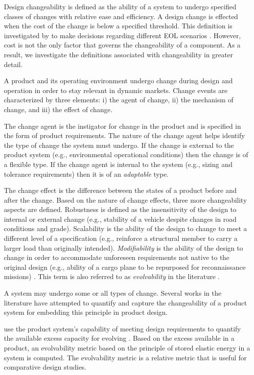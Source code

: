 Design changeability is defined as the ability of a system to undergo specified classes of changes with relative ease and efficiency. A design change is effected when the cost of the change is below a specified threshold. This definition is investigated by \citeauthor{Lawand2019} to make decisions regarding different \ac{EOL} scenarios \cite{Lawand2019}. However, cost is not the only factor that governs the changeability of a component. As a result, we investigate the definitions associated with changeability in greater detail.

A product and its operating environment undergo change during design and operation in order to stay relevant in dynamic markets. Change events are characterized by three elements: i) the agent of change, ii) the mechanism of change, and iii) the effect of change. 

The change agent is the instigator for change in the product and is specified in the form of product requirements. The nature of the change agent helps identify the type of change the system must undergo. If the change is external to the product system (e.g., environmental operational conditions) then the change is of a {flexible} type. If the change agent is internal to the system (e.g., sizing and tolerance requirements) then it is of an \textit{adaptable} type. 

The change effect is the difference between the states of a product before and after the change. Based on the nature of change effects, three more changeability aspects are defined. {Robustness} is defined as the insensitivity of the design to internal or external change (e.g., stability of a vehicle despite changes in road conditions and grade). {Scalability} is the ability of the design to change to meet a different level of a specification (e.g., reinforce a structural member to carry a larger load than originally intended). \textit{Modifiability} is the ability of the design to change in order to accommodate unforeseen requirements not native to the original design (e.g., ability of a cargo plane to be repurposed for reconnaissance missions) \cite{Ross2008}. This term is also referred to as \textit{evolvability} in the literature \cite{Tackett2014}. 

A system may undergo some or all types of change. Several works in the literature have attempted to quantify and capture the changeability of a product system for embedding this principle in product design. 

\citeauthor{Tackett2014} use the product system's capability of meeting design requirements to quantify the available excess capacity for evolving \cite{Tackett2014}. Based on the excess available in a product, an evolvability metric based on the principle of stored elastic energy in a system is computed. The evolvability metric is a relative metric that is useful for comparative design studies.


